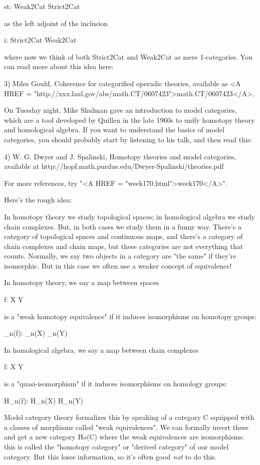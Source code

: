 st: Weak2Cat \to  Strict2Cat

as the left adjoint of the inclusion

i: Strict2Cat \to  Weak2Cat

where now we think of both Strict2Cat and Weak2Cat as mere 
1-categories.  You can read more about this idea here:

3) Miles Gould, Coherence for categorified operadic theories, 
available as <A HREF = "http://xxx.lanl.gov/abs/math.CT/0607423">math.CT/0607423</A>.

On Tuesday night, Mike Shulman gave an introduction to model 
categories, which are a tool developed by Quillen in the late
1960s to unify homotopy theory and homological algebra.
If you want to understand the basics of model categories, you 
should probably start by listening to his talk, and then read
this:

4) W. G. Dwyer and J. Spalinski, Homotopy theories and model 
categories, available at 
http://hopf.math.purdue.edu/Dwyer-Spalinski/theories.pdf

For more references, try "<A HREF =
"week170.html">week170</A>".

Here's the rough idea:

In homotopy theory we study topological spaces; in homological
algebra we study chain complexes.  But, in both cases we study
them in a funny way.  There's a category of topological spaces
and continuous maps, and there's a category of chain complexes 
and chain maps, but these categories are not everything that 
counts.  Normally, we say two objects in a category are "the
same" if they're isomorphic.  But in this case we often use a
weaker concept of equivalence!

In homotopy theory, we say a map between spaces

f: X \to  Y

is a "weak homotopy equivalence" if it induces isomorphisms on
homotopy groups:

\pi _{n}(f): \pi _{n}(X) \to  \pi _{n}(Y)

In homological algebra, we say a map between chain complexes

f: X \to  Y 

is a "quasi-isomorphism" if it induces isomorphisms on
homology groups:

H_{n}(f): H_{n}(X) \to  H_{n}(Y)

Model category theory formalizes this by speaking of a category C
equipped with a classes of morphisms called "weak
equivalences".  We can formally invert these and get a new
category Ho(C) where the weak equivalences are isomorphisms: this is
called the "homotopy category" or "derived
category" of our model category.  But this loses information, so
it's often good \emph{not} to do this.

